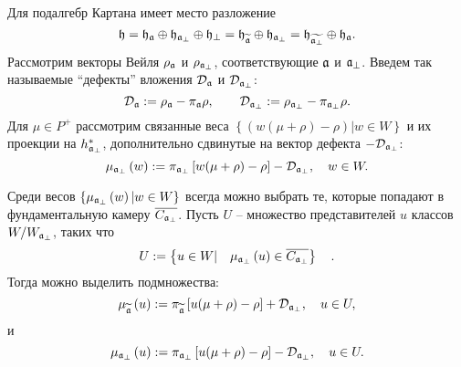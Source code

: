 Для подалгебр Картана имеет место разложение
\begin{equation}
\frak{h}=\frak{\frak{h}_{\frak{a}}}\oplus \frak{h}_{\frak{a}_{\perp }}\oplus
\frak{h}_{\perp }=\frak{\frak{h}_{\widetilde{\frak{a}}}}\oplus \frak{h}_{%
\frak{a}_{\perp }}=\frak{\frak{h}_{\widetilde{\frak{a}_{\perp }}}}\oplus
\frak{h}_{\frak{a}}.
\end{equation}
Рассмотрим векторы Вейля  $\rho _{\frak{a}}$ и $\rho _{\frak{a}_{\perp}} $, соответствующие  $\frak{a}$ и $\frak{a}_{\perp }$.
Введем так называемые ``дефекты'' вложения  $\mathcal{D}_{\frak{a}}$ и $\mathcal{D}_{\frak{a}_{\perp }}$:
\begin{equation}
\mathcal{D}_{\frak{a}}:=\rho _{\frak{a}}-\pi _{\frak{a}}\rho , \qquad
\mathcal{D}_{\frak{a}_{\perp }}:=\rho _{\frak{a}_{\perp }}-\pi _{\frak{a}%
_{\perp }}\rho .  \label{defect ort}
\end{equation}
Для  $\mu \in P^{+}$ рассмотрим связанные веса  $\left\{\left( w(\mu +\rho )-\rho \right) |w\in W\right\} $ и их проекции на $h_{\frak{a}_{\perp }}^{\ast }$, дополнительно сдвинутые на вектор дефекта $-\mathcal{D}_{\frak{a}_{\perp }}$:
\begin{equation*}
\mu _{\frak{a}_{\perp }}\left( w\right) :=\pi _{\frak{a}_{\perp }}\left[
w(\mu +\rho )-\rho \right] -\mathcal{D}_{\frak{a}_{\perp }},\quad w\in W.
\end{equation*}

Среди весов  $\left\{ \mu _{\frak{a}_{\perp
}}\left( w\right) |w\in W\right\} $ всегда можно выбрать те, которые попадают в фундаментальную камеру $\overline{C_{\frak{a}_{\perp }}}$. Пусть $U$ -- множество представителей $u$ классов  $W/W_{\frak{a}_{\perp }}$, таких что
\begin{equation}
U:=\left\{ u\in W|\quad \mu _{\frak{a}_{\perp }}\left( u\right) \in
\overline{C_{\frak{a}_{\perp }}}\right\} \quad .  \label{U-def}
\end{equation}
Тогда можно выделить подмножества:
\begin{equation}
\mu _{\widetilde{\mathfrak{a}}}\left( u\right) :=\pi _{\widetilde{%
\mathfrak{a}}}\left[ u(\mu +\rho )-\rho \right] +\mathcal{D}_{\frak{a}%
_{\perp }},\quad u\in U,  \label{mu-a}
\end{equation}
и
\begin{equation}
\mu _{\frak{a}_{\perp }}\left( u\right) :=\pi _{\frak{a}_{\perp }}\left[
u(\mu +\rho )-\rho \right] -\mathcal{D}_{\frak{a}_{\perp }},\quad u\in U.
\label{mu-a-tilda}
\end{equation}


